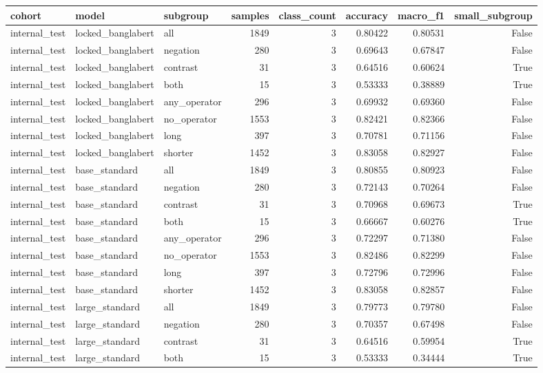 \begin{tabular}{lllrrrrr}
\toprule
cohort & model & subgroup & samples & class\_count & accuracy & macro\_f1 & small\_subgroup \\
\midrule
internal\_test & locked\_banglabert & all & 1849 & 3 & 0.80422 & 0.80531 & False \\
internal\_test & locked\_banglabert & negation & 280 & 3 & 0.69643 & 0.67847 & False \\
internal\_test & locked\_banglabert & contrast & 31 & 3 & 0.64516 & 0.60624 & True \\
internal\_test & locked\_banglabert & both & 15 & 3 & 0.53333 & 0.38889 & True \\
internal\_test & locked\_banglabert & any\_operator & 296 & 3 & 0.69932 & 0.69360 & False \\
internal\_test & locked\_banglabert & no\_operator & 1553 & 3 & 0.82421 & 0.82366 & False \\
internal\_test & locked\_banglabert & long & 397 & 3 & 0.70781 & 0.71156 & False \\
internal\_test & locked\_banglabert & shorter & 1452 & 3 & 0.83058 & 0.82927 & False \\
internal\_test & base\_standard & all & 1849 & 3 & 0.80855 & 0.80923 & False \\
internal\_test & base\_standard & negation & 280 & 3 & 0.72143 & 0.70264 & False \\
internal\_test & base\_standard & contrast & 31 & 3 & 0.70968 & 0.69673 & True \\
internal\_test & base\_standard & both & 15 & 3 & 0.66667 & 0.60276 & True \\
internal\_test & base\_standard & any\_operator & 296 & 3 & 0.72297 & 0.71380 & False \\
internal\_test & base\_standard & no\_operator & 1553 & 3 & 0.82486 & 0.82299 & False \\
internal\_test & base\_standard & long & 397 & 3 & 0.72796 & 0.72996 & False \\
internal\_test & base\_standard & shorter & 1452 & 3 & 0.83058 & 0.82857 & False \\
internal\_test & large\_standard & all & 1849 & 3 & 0.79773 & 0.79780 & False \\
internal\_test & large\_standard & negation & 280 & 3 & 0.70357 & 0.67498 & False \\
internal\_test & large\_standard & contrast & 31 & 3 & 0.64516 & 0.59954 & True \\
internal\_test & large\_standard & both & 15 & 3 & 0.53333 & 0.34444 & True \\

\end{tabular}
